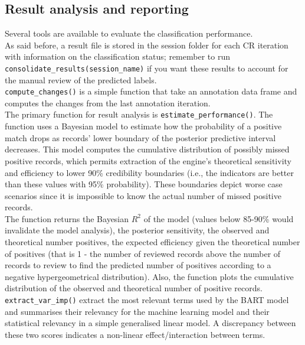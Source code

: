 \documentclass[
]{article}
\begin{document}
\hypertarget{result-analysis-and-reporting}{%
\subsection{Result analysis and
reporting}\label{result-analysis-and-reporting}}

Several tools are available to evaluate the classification
performance.\\
As said before, a result file is stored in the session folder for each
CR iteration with information on the classification status; remember to
run \texttt{consolidate\_results(session\_name)} if you want these
results to account for the manual review of the predicted labels.\\
\texttt{compute\_changes()} is a simple function that take an annotation
data frame and computes the changes from the last annotation
iteration.\\
The primary function for result analysis is
\texttt{estimate\_performance()}. The function uses a Bayesian model to
estimate how the probability of a positive match drops as records' lower
boundary of the posterior predictive interval decreases. This model
computes the cumulative distribution of possibly missed positive
records, which permits extraction of the engine's theoretical
sensitivity and efficiency to lower 90\% credibility boundaries (i.e.,
the indicators are better than these values with 95\% probability).
These boundaries depict worse case scenarios since it is impossible to
know the actual number of missed positive records.\\
The function returns the Bayesian \(R^2\) of the model (values below
85-90\% would invalidate the model analysis), the posterior sensitivity,
the observed and theoretical number positives, the expected efficiency
given the theoretical number of positives (that is 1 - the number of
reviewed records above the number of records to review to find the
predicted number of positives according to a negative hypergeometrical
distribution). Also, the function plots the cumulative distribution of
the observed and theoretical number of positive records.\\
\texttt{extract\_var\_imp()} extract the most relevant terms used by the
BART model and summarises their relevancy for the machine learning model
and their statistical relevancy in a simple generalised linear model. A
discrepancy between these two scores indicates a non-linear
effect/interaction between terms.
\end{document}
